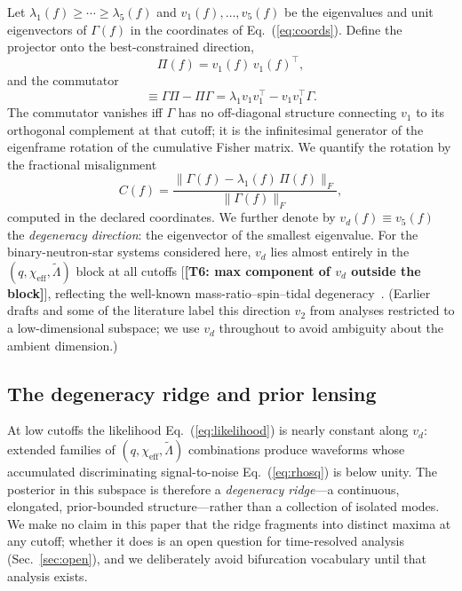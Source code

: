 \documentclass[twocolumn,prd,showpacs,superscriptaddress]{revtex4-2}
\newcommand{\comm}[2]{[#1, #2]}
\newcommand{\norm}[1]{\lVert #1 \rVert}
\newcommand{\Lambdatilde}{\tilde{\Lambda}}
\newcommand{\chieff}{\chi_{\text{eff}}}
\newcommand{\vd}{v_{d}}          %
\newcommand{\secref}[1]{Sec.~\ref{sec:#1}}
\newcommand{\eqnref}[1]{Eq.~(\ref{eq:#1})}
\newcommand{\manifest}[1]{\textbf{[#1]}}
\begin{document}
Let $\lambda_1(f) \ge \cdots \ge \lambda_5(f)$ and $v_1(f), \ldots,
v_5(f)$ be the eigenvalues and unit eigenvectors of $\Gamma(f)$ in the
coordinates of \eqnref{coords}.  Define the projector onto the
best-constrained direction,
\begin{equation}
\Pi(f) = v_1(f)\,v_1(f)^{\top},
\label{eq:projector}
\end{equation}
and the commutator
\begin{equation}
\comm{\Gamma}{\Pi} \equiv \Gamma\Pi - \Pi\Gamma
= \lambda_1 v_1 v_1^{\top} - v_1 v_1^{\top}\Gamma .
\label{eq:commutator_def}
\end{equation}
The commutator vanishes iff $\Gamma$ has no off-diagonal structure
connecting $v_1$ to its orthogonal complement at that cutoff; it is the
infinitesimal generator of the eigenframe rotation of the cumulative
Fisher matrix.  We quantify the rotation by the fractional misalignment
\begin{equation}
C(f) = \frac{\norm{\Gamma(f) - \lambda_1(f)\,\Pi(f)}_F}
{\norm{\Gamma(f)}_F},
\label{eq:cross_coupling}
\end{equation}
computed in the declared coordinates.  We further denote by
$\vd(f) \equiv v_5(f)$ the \emph{degeneracy direction}: the eigenvector
of the smallest eigenvalue.  For the binary-neutron-star systems
considered here, $\vd$ lies almost entirely in the
$(q, \chieff, \Lambdatilde)$ block at all cutoffs
[\manifest{T6: max component of $\vd$ outside the block}], reflecting
the well-known mass-ratio--spin--tidal degeneracy~\cite{chatziioannou2020bns}.
(Earlier drafts and some of the literature label this direction $v_2$
from analyses restricted to a low-dimensional subspace; we use $\vd$
throughout to avoid ambiguity about the ambient dimension.)

\subsection{The degeneracy ridge and prior lensing}
\label{sec:ridge}

At low cutoffs the likelihood \eqnref{likelihood} is nearly constant
along $\vd$: extended families of $(q, \chieff, \Lambdatilde)$
combinations produce waveforms whose accumulated discriminating
signal-to-noise \eqnref{rhosq} is below unity.  The posterior in this
subspace is therefore a \emph{degeneracy ridge}---a continuous,
elongated, prior-bounded structure---rather than a collection of
isolated modes.  We make no claim in this paper that the ridge fragments
into distinct maxima at any cutoff; whether it does is an open question
for time-resolved analysis (\secref{open}), and we deliberately avoid
bifurcation vocabulary until that analysis exists.
\end{document}

